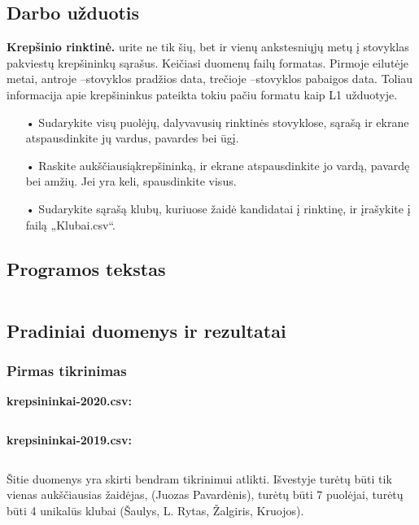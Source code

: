 \documentclass{article}
\begin{document}
\subsection{Darbo užduotis}
\textbf{Krepšinio rinktinė.} urite  ne  tik  šių,  bet  ir  vienų  ankstesniųjų  metų  į  stovyklas  pakviestų krepšininkų sąrašus. Keičiasi duomenų failų formatas. Pirmoje eilutėje metai, antroje –stovyklos pradžios data, trečioje –stovyklos pabaigos data. Toliau informacija apie krepšininkus pateikta tokiu pačiu formatu kaip L1 užduotyje.
\begin{itemize}
    \item[•]Sudarykite visų puolėjų, dalyvavusių rinktinės stovyklose, sąrašą ir ekrane atspausdinkite jų vardus, pavardes bei ūgį.
    \item[•]Raskite aukščiausiąkrepšininką, ir ekrane atspausdinkite jo vardą, pavardę bei amžių. Jei yra keli, spausdinkite visus.
    \item[•]Sudarykite sąrašą klubų, kuriuose žaidė kandidatai į rinktinę, ir įrašykite į failą „Klubai.csv“.
\end{itemize}

\subsection{Programos tekstas}
\inputminted{csharp}{Assets/L2/L2-rawtext.txt}
\newpage

\subsection{Pradiniai duomenys ir rezultatai}

\subsubsection{Pirmas tikrinimas}
\begin{changemargin}{0cm}{0cm}
    \textbf{krepsininkai-2020.csv:}
\end{changemargin}

\inputminted{csharp}{Assets/L2/test1-input1.txt}

\begin{changemargin}{0cm}{0cm}
    \textbf{krepsininkai-2019.csv:}
\end{changemargin}

\inputminted{csharp}{Assets/L2/test1-input2.txt}


\begin{changemargin}{0cm}{0cm}
    Šitie duomenys yra skirti bendram tikrinimui atlikti. Išvestyje turėtų būti tik vienas aukščiausias žaidėjas,
    (Juozas Pavardėnis), turėtų būti 7 puolėjai, turėtų būti 4 unikalūs klubai (Šaulys, L. Rytas, Žalgiris, Kruojos).
\end{changemargin}
\end{document}
